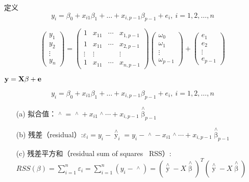 \documentclass[xetex,mathserif,serif]{beamer}
\begin{document}
\begin{frame}{定义}
\[ y_i = \beta_0+x_{i1}\beta_1+ \dots + x_{i,p-1}\beta_{p-1}+e_i, \ i=1,2,\dots,n\]

\[\left( {\begin{array}{*{20}{c}}
{{y_1}}\\
{{y_2}}\\
 \vdots \\
{{y_n}}
\end{array}} \right) = \left( {\begin{array}{*{20}{c}}
1&{{x_{11}}}& \cdots &{{x_{1,p - 1}}}\\
1&{{x_{11}}}& \cdots &{{x_{2,p - 1}}}\\
 \vdots & \vdots &{}& \vdots \\
1&{{x_{11}}}& \cdots &{{x_{n,p - 1}}}
\end{array}} \right)\left( {\begin{array}{*{20}{c}}
{{\omega _0}}\\
{{\omega _1}}\\
 \vdots \\
{{\omega _{p - 1}}}
\end{array}} \right) + \left( {\begin{array}{*{20}{c}}
{{e_1}}\\
{{e_2}}\\
 \vdots \\
{{e_{p - 1}}}
\end{array}} \right)\]

$\bf{y}=\bf{X\beta}+\bf{e}$

\end{frame}

\begin{frame}
\[ y_i = \beta_0+x_{i1}\beta_1+ \dots + x_{i,p-1}\beta_{p-1}+e_i, \ i=1,2,\dots,n\]
\begin{itemize}
  \item[(a)] 拟合值：$\mathop {{y_i}}\limits^ \wedge   = \mathop {{\beta _0}}\limits^ \wedge   + {x_{i1}}\mathop {{\beta _1}}\limits^ \wedge   \cdots  + {x_{i,p - 1}}{{\mathop \beta \limits^ \wedge}  _{p - 1}}$
  \item[(b)] 残差（residual）:${\varepsilon _i} = {y_i} - {{\mathop y\limits^ \wedge}  _i} = {y_i} - \mathop {{\beta _0}}\limits^ \wedge   - {x_{i1}}\mathop {{\beta _1}}\limits^ \wedge   \cdots  + {x_{i,p - 1}}{{\mathop \beta \limits^ \wedge }_{p - 1}}$
  \item[(c)] 残差平方和（residual sum of squares \ RSS）:$RSS \left(\beta\right) = \sum\limits_{i=1}^{n}\varepsilon_i = \sum\limits_{i=1}^{n}\left(y_i - \mathop {{y_i}}\limits^ \wedge\right) = {{{\left( {\mathop y\limits^ \wedge   - X\mathop \beta \limits^ \wedge  } \right)}^T}\left( {\mathop y\limits^ \wedge   - X\mathop \beta \limits^ \wedge  } \right)}$
\end{itemize}
\end{frame}
\end{document}
